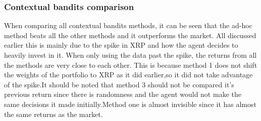\documentclass[a4paper,12pt]{article}
\begin{document}
\subsubsection{Contextual bandits comparison}
When comparing all contextual bandits methods, it can be seen that the ad-hoc method beats all the other methods and it outperforms the market. All discussed earlier this is mainly due to the spike in XRP and how the agent decides to heavily invest in it. When only using the data past the spike, the returns from all the methods are very close to each other. This is because method 1 does not shift the weights of the portfolio to XRP as it did earlier,so it did not take advantage of the spike.It should be noted that method 3 should not be compared it’s previous return since there is randomness and the agent would not make the same decisions it made initially.Method one is almost invisible since it has almost the same returns as the market. 
\end{document}
